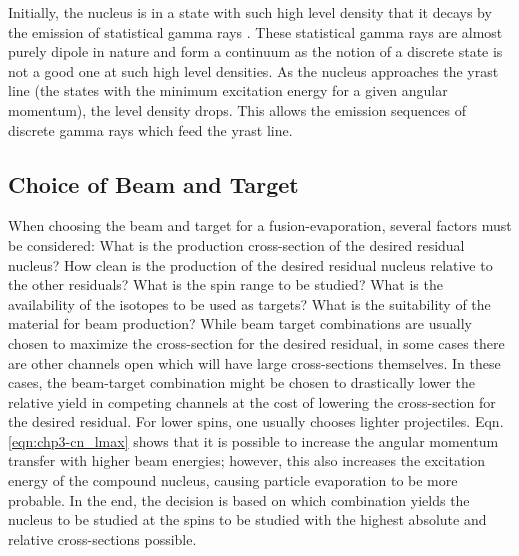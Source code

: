 Initially, the nucleus is in a state with such high level density that it decays by the emission of statistical gamma rays \cite{cnCooling}. These statistical gamma rays are almost purely dipole in nature and form a continuum as the notion of a discrete state is not a good one at such high level densities. As the nucleus approaches the yrast line (the states with the minimum excitation energy for a given angular momentum), the level density drops. This allows the emission sequences of discrete gamma rays which feed the yrast line.

\subsection{Choice of Beam and Target}
\label{ssec:exp-pr-fus-evap-beam-target}
When choosing the beam and target for a fusion-evaporation, several factors must be considered: What is the production cross-section of the desired residual nucleus? How clean is the production of the desired residual nucleus relative to the other residuals? What is the spin range to be studied? What is the availability of the isotopes to be used as targets? What is the suitability of the material for beam production? While beam target combinations are usually chosen to maximize the cross-section for the desired residual, in some cases there are other channels open which will have large cross-sections themselves. In these cases, the beam-target combination might be chosen to drastically lower the relative yield in competing channels at the cost of lowering the cross-section for the desired residual. For lower spins, one usually chooses lighter projectiles. Eqn. \ref{eqn:chp3-cn_lmax} shows that it is possible to increase the angular momentum transfer with higher beam energies; however, this also increases the excitation energy of the compound nucleus, causing particle evaporation to be more probable. In the end, the decision is based on which combination yields the nucleus to be studied at the spins to be studied with the highest absolute and relative cross-sections possible.

